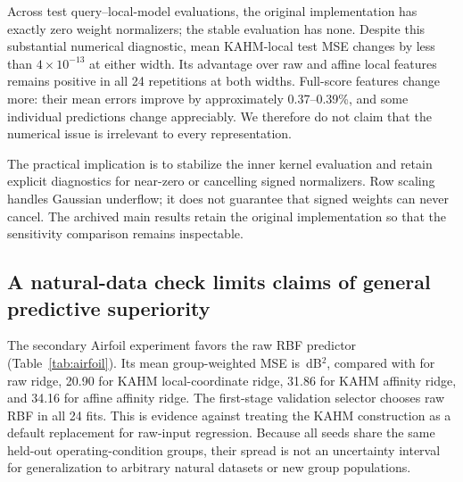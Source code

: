 \documentclass[10pt]{article}
\begin{document}
Across \NumericalQueryClusterCount{} test query--local-model evaluations, the
original implementation has \NumericalOriginalZeroCount{} exactly zero weight normalizers; the stable
evaluation has none. Despite this substantial numerical diagnostic,
mean KAHM-local test MSE changes by less than $4\times10^{-13}$ at either
width. Its advantage over raw and affine local features remains positive
in all 24 repetitions at both widths. Full-score features change more:
their mean errors improve by approximately 0.37--0.39\%, and some
individual predictions change appreciably. We therefore do not claim that
the numerical issue is irrelevant to every representation.

\begin{table}[t]
 \caption{Post-hoc Van der Pol numerical sensitivity on the same 24
 second-stage banks and samples. Stable query evaluation removes observed
 zero denominators while leaving local-coordinate mean MSE effectively
 unchanged. $\Delta_r$ is the original-minus-stable MSE difference within
 repetition $r$; wins count stable predictions beating the raw and affine
 local controls at the same width. These comparisons are outside the two primary
 interval families.}
 \label{tab:numerical}
 \centering\small
 
\end{table}

The practical implication is to stabilize the inner kernel evaluation and
retain explicit diagnostics for near-zero or cancelling signed normalizers.
Row scaling handles Gaussian underflow; it does not guarantee that signed
weights can never cancel. The archived main results retain the original
implementation so that the sensitivity comparison remains inspectable.

\subsection{A natural-data check limits claims of general predictive superiority}
\label{sec:airfoil}

The secondary Airfoil experiment favors the raw RBF predictor
(Table~\ref{tab:airfoil}). Its mean group-weighted MSE is \AirfoilRawRBFMSE\,dB$^2$,
compared with \AirfoilRawRidgeMSE{} for raw ridge, 20.90 for KAHM local-coordinate ridge,
31.86 for KAHM affinity ridge, and 34.16 for affine affinity ridge.
The first-stage validation selector chooses raw RBF in all 24 fits.
This is evidence against treating the KAHM construction as a default
replacement for raw-input regression. Because all seeds share the same
held-out operating-condition groups, their spread is not an uncertainty
interval for generalization to arbitrary natural datasets or new group
populations.
\end{document}
